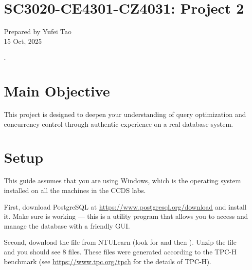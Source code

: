 


\usepackage{amsfonts, amsmath, amssymb, amsthm}
\usepackage{comment}
\usepackage{graphicx}
\usepackage{hyperref}
\usepackage{ifthen}
\usepackage{latexsym}
\usepackage[normalem]{ulem}



\def\dom{\prec}
\def\T{\mathcal{T}}

\def\vgap{\vspace{3mm}}




\section*{SC3020-CE4301-CZ4031: Project 2}

Prepared by Yufei Tao \\
15 Oct, 2025 \\

\vgap

\noindent {}.


\section{Main Objective}

This project is designed to deepen your understanding of query optimization and concurrency control through authentic experience on a real database system.

\section{Setup}

This guide assumes that you are using Windows, which is the operating system installed on all the machines in the CCDS labs.

\vgap

First, download PostgreSQL at \url{https://www.postgresql.org/download} and install it. Make sure  is working --- this is a utility program that allows you to access and manage the database with a friendly GUI.

\vgap

Second, download the file  from NTULearn (look for  and then ). Unzip the file and you should see 8  files. These files were generated according to the TPC-H benchmark (see \url{https://www.tpc.org/tpch} for the details of TPC-H).

